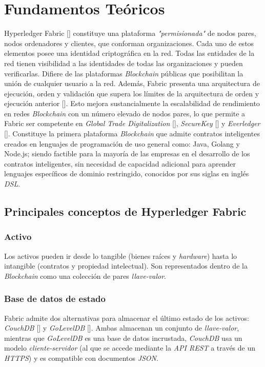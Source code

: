 \chapter{Fundamentos Teóricos}\label{chapter:theoretical_framework}

Hyperledger Fabric [\cite{HF}] constituye una plataforma \emph{"permisionada"} de nodos pares, nodos ordenadores y clientes, que conforman organizaciones. Cada uno de estos elementos posee una identidad criptogr\'afica en la red. Todas las entidades de la red tienen visibilidad a las identidades de todas las organizaciones y pueden verificarlas. Difiere de las plataformas \emph{Blockchain} p\'ublicas que posibilitan la uni\'on de cualquier usuario a la red. Adem\'as, Fabric presenta una arquitectura de ejecuci\'on, orden y validaci\'on que supera los l\'imites de la arquitectura de orden y ejecuci\'on anterior [\cite{androulaki2018hyperledger}]. Esto mejora sustancialmente la escalabilidad de rendimiento en redes \emph{Blockchain} con un n\'umero elevado de nodos pares, lo que permite a Fabric ser competente en \emph{Global Trade Digitalization} [\cite{digitizing-global}], \emph{SecureKey} [\cite{securekey}] y \emph{Everledger} [\cite{everledger}]. Constituye la primera plataforma \emph{Blockchain} que admite contratos inteligentes creados en lenguajes de programaci\'on de uso general como: Java, Golang y Node.js; siendo factible para la mayor\'ia de las empresas en el desarrollo de los contratos inteligentes, sin necesidad de capacidad adicional para aprender lenguajes espec\'ificos de dominio restringido, conocidos por sus siglas en ingl\'es \emph{DSL}. 


\section{Principales conceptos de Hyperledger Fabric}

\subsection{Activo}
Los activos pueden ir desde lo tangible (bienes ra\'ices y \emph{hardware}) hasta lo intangible (contratos y propiedad intelectual). Son representados dentro de la \emph{Blockchain} como una colecci\'on de pares \emph{llave-valor}.

\subsection{Base de datos de estado}
Fabric admite dos alternativas para almacenar el \'ultimo estado de los activos: \emph{CouchDB} [\cite{CouchDB}] y \emph{GoLevelDB} [\cite{GoLevelDB}]. Ambas almacenan un conjunto de \emph{llave-valor}, mientras que \emph{GoLevelDB} es una base de datos incrustada, \emph{CouchDB} usa un modelo \emph{cliente-servidor} (al que se accede mediante la \emph{API REST} a trav\'es de un \emph{HTTPS}) y es compatible con documentos \emph{JSON}.

